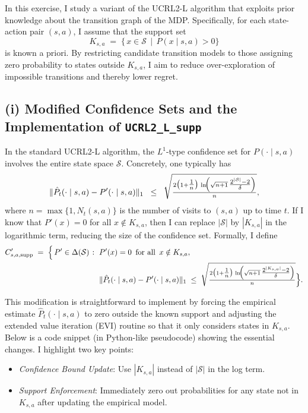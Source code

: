 In this exercise, I study a variant of the UCRL2-L algorithm that exploits prior knowledge about the transition graph of the MDP. Specifically, for each state-action pair $(s,a)$, I assume that the support set 
\[
K_{s,a} \;=\; \{\,x \in \mathcal{S} \,\mid\, P(x \mid s,a) > 0\}
\]
is known a priori. By restricting candidate transition models to those assigning zero probability to states outside $K_{s,a}$, I aim to reduce over-exploration of impossible transitions and thereby lower regret.

\subsection*{(i) Modified Confidence Sets and the Implementation of \texttt{UCRL2\_L\_supp}}

In the standard UCRL2-L algorithm, the $L^1$-type confidence set for $P(\cdot\mid s,a)$ involves the entire state space $\mathcal{S}$. Concretely, one typically has
\[
\|\hat{P}_t(\cdot\mid s,a) - P'(\cdot\mid s,a)\|_1 
\;\;\le\;\; 
\sqrt{
\tfrac{2\bigl(1+\tfrac{1}{n}\bigr)\,\ln\!\Bigl(\sqrt{n+1}\,\tfrac{2^{|\mathcal{S}|}-2}{\delta}\Bigr)}
{n}
},
\]
where $n = \max\{1, N_t(s,a)\}$ is the number of visits to $(s,a)$ up to time $t$. If I know that $P'(x) = 0$ for all $x \notin K_{s,a}$, then I can replace $|\mathcal{S}|$ by $|K_{s,a}|$ in the logarithmic term, reducing the size of the confidence set. Formally, I define
\[
\begin{aligned}
C'_{s,a,\text{supp}} \;=\; \Bigl\{
\,P' \in \Delta(\mathcal{S}) 
\;\colon\;&P'(x) = 0 \,\text{ for all }\, x \notin K_{s,a},\\
&\|\hat{P}_t(\cdot\mid s,a) - P'(\cdot\mid s,a)\|_1 
\;\le\;
\sqrt{
\tfrac{2\bigl(1+\tfrac{1}{n}\bigr)\,\ln\!\Bigl(\sqrt{n+1}\,\tfrac{2^{|K_{s,a}|}-2}{\delta}\Bigr)}
{n}
}
\Bigr\}.
\end{aligned}
\]

This modification is straightforward to implement by forcing the empirical estimate $\hat{P}_t(\cdot\mid s,a)$ to zero outside the known support and adjusting the extended value iteration (EVI) routine so that it only considers states in $K_{s,a}$. Below is a code snippet (in Python-like pseudocode) showing the essential changes. I highlight two key points:

\begin{itemize}
  \item \emph{Confidence Bound Update}: Use $|K_{s,a}|$ instead of $|\mathcal{S}|$ in the log term.
  \item \emph{Support Enforcement}: Immediately zero out probabilities for any state not in $K_{s,a}$ after updating the empirical model.
\end{itemize}

